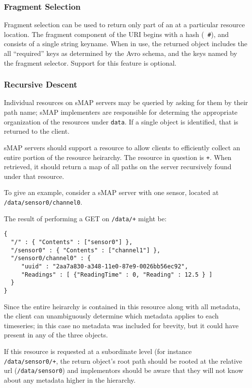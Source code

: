 \documentclass[10pt,letterpaper]{article}
\newcommand{\smap}{sMAP}
\begin{document}
\subsubsection{Fragment Selection}

Fragment selection can be used to return only part of an at a particular
resource location.  The fragment component of the URI begins with a hash ({\tt
  \#}), and consists of a single string keyname.  When in use, the returned
object includes the all ``required'' keys as determined by the Avro schema, and
the keys named by the fragment selector.  Support for this feature is optional.

\subsubsection{Recursive Descent}

Individual resources on \smap{} servers may be queried by asking for them by
their path name; \smap{} implementers are responsible for determing the
appropriate organization of the resources under {\tt data}.  If a single
object is identified, that is returned to the client.

\smap{} servers should support a resource to allow clients to efficiently
collect an entire portion of the resource heirarchy.   The resource in
question is {\tt +}.  When retrieved, it should return a map of
all paths on the server recursively found under that resource.

To give an example, consider a \smap{} server with one sensor, located at {\tt
  /data/sensor0/channel0}.

The result of performing a GET on {\tt /data/+} might be:
\begin{verbatim}
{
  "/" : { "Contents" : ["sensor0"] },
  "/sensor0" : { "Contents" : ["channel1"] },
  "/sensor0/channel0" : {
     "uuid" : "2aa7a830-a348-11e0-87e9-0026bb56ec92",
     "Readings" : [ {"ReadingTime" : 0, "Reading" : 12.5 } ]
  }
}
\end{verbatim}

Since the entire heirarchy is contained in this resource along with all
metadata, the client can unambiguously determine which metadata applies to
each timeseries; in this case no metadata was included for brevity, but it
could have present in any of the three objects.

If this resource is requested at a subordinate level (for instance {\tt
  /data/sensor0/+}, the return object's root path should be rooted
at the relative url ({\tt /data/sensor0}) and implementors should be aware
that they will not know about any metadata higher in the hierarchy.
\end{document}
